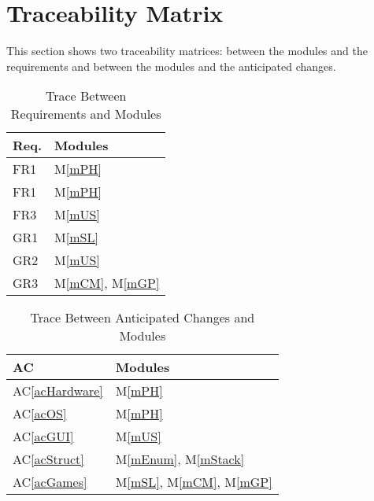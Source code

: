 \documentclass[12pt, titlepage]{article}
\newcommand{\acref}[1]{AC\ref{#1}}
\newcommand{\mref}[1]{M\ref{#1}}
\begin{document}
	\section{Traceability Matrix} \label{SecTM}
	This section shows two traceability matrices: between the modules and the
	requirements and between the modules and the anticipated changes.
	\begin{table}[H]
		\centering
		\begin{tabular}{p{} p{}}
			\toprule
			\textbf{Req.} & \textbf{Modules}\\
			\midrule
			FR1 & \mref{mPH}\\
			FR1 & \mref{mPH}\\
			FR3 & \mref{mUS}\\
			GR1 & \mref{mSL}\\
			GR2 & \mref{mUS}\\
			GR3 & \mref{mCM}, \mref{mGP}\\
			\bottomrule
		\end{tabular}
		\caption{Trace Between Requirements and Modules}
		\label{TblRT}
	\end{table}
	\begin{table}[H]
		\centering
		\begin{tabular}{p{} p{}}
			\toprule
			\textbf{AC} & \textbf{Modules}\\
			\midrule
			\acref{acHardware} & \mref{mPH}\\
			\acref{acOS} & \mref{mPH}\\
			\acref{acGUI} & \mref{mUS}\\
			\acref{acStruct} & \mref{mEnum}, \mref{mStack}\\
			\acref{acGames} & \mref{mSL}, \mref{mCM}, \mref{mGP}\\
			\bottomrule
		\end{tabular}
		\caption{Trace Between Anticipated Changes and Modules}
		\label{TblACT}
	\end{table}
\end{document}
